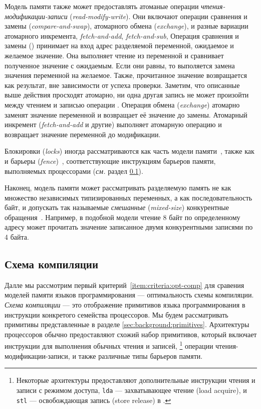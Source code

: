 Модель памяти также может предоставлять атоманые операции 
\emph{чтения-модификации-записи} (\emph{read-modify-write}).
Они включают операции сравнения и замены (\emph{compare-and-swap}), 
атомарного обмена (\emph{exchange}), и разные вариации атомарного инкремента, 
\eg \emph{fetch-and-add}, \emph{fetch-and-sub}, \etc 
Операция сравнения и замены (\CAS) принимает на вход 
адрес разделяемой переменной, ожидаемое и желаемое значение.
Она выполняет чтение из переменной и сравнивает полученное значение 
с ожидаемым. Если они равны, то выполяется замена значения переменной 
на желаемое. Также, прочитанное значение возвращается как результат, 
вне зависимости от успеха проверки. 
Заметим, что описанные выше действия просходят атомарно, 
ни одна другая запись не может произойти между 
чтением и записью операции \CAS.
Операция обмена (\emph{exchange}) атомарно 
заменят значение переменной и возвращает её 
значение до замены. 
Атомарный инкремент (\emph{fetch-and-add} и другие) выполняет
атомарную операцию и возвращает значение переменной до модификации.  

Блокировки (\emph{locks}) иногда рассматриваются 
как часть модели памяти~\cite{Manson-al:POPL05}, 
также как и барьеры (\emph{fence})~\cite{Batty-al:POPL11},
соответствующие инструкциям барьеров памяти, 
выполняемых процессорами  
(\emph{см.} раздел \cref{sec:background:compile}). 

Наконец, модель памяти может рассматривать разделяемую память 
не как множество независимых типизированных переменных, 
а как последовательность байт, и допускать 
так называемые \emph{смешанные} (\emph{mixed-size}) 
конкурентные обращения~\cite{Flur-al:POPL17}. 
Например, в подобной модели чтение 8 байт по определенному адресу
может прочитать значение записанное двумя конкурентными 
записями по 4 байта.

\subsection{Схема компиляции}
\label{sec:background:compile}

Далле мы рассмотрим первый критерий~\ref{item:criteria:opt-comp}
для сравения моделей памяти языков программирования --- 
оптимальность схемы компиляции. 
\emph{Схема компиляции} --- это отображение
примитивов языка программирования в инструкции 
конкретого семейства процессоров.  
Мы будем рассматривать примитивы представленные в 
разделе \cref{sec:background:primitives}.
Архитектуры процессоров обычно предоставляют 
схожий набор примитивов, который включает 
инструкции для выполнения обычных чтения и записей,%
\footnote{Некоторые архитектуры
предоставляют дополнительные инструкции чтения и 
записи с режимом доступа, \eg 
\eg \texttt{lda} --- захватывающее чтение (load acquire), 
и \texttt{stl} --- освобождающая запись (store release) в .} 
операции чтения-модификации-записи, и 
также различные типы барьеров памяти.

